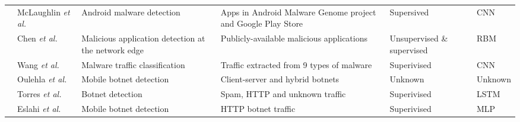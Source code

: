 \documentclass[journal,comsoc,letter]{IEEEtran}
\begin{document}
\begin{table*}[h!]
\begin{tabular}{|c|C{2.1cm}|C{3.3cm}|C{6cm}|C{1.7cm}|C{1.7cm}|}
                                      & McLaughlin \emph{et al.} \cite{mclaughlin2017deep}       & Android malware detection                                       & Apps in Android Malware Genome project and Google Play Store                                                                          & Supersived                 & CNN                                                      \\  
                                      & Chen \emph{et al.} \cite{chen2017deep123}                & Malicious application detection at the network edge             & Publicly-available malicious applications                                                                                             & Unsupervised \& supervised & RBM                                                      \\  
                                      & Wang \emph{et al.} \cite{wang2017malware}                & Malware traffic classification                                  & Traffic extracted from 9 types of malware                                                                                             & Superivised                & CNN                                                      \\  
                                      & Oulehla \emph{et al.} \cite{oulehla2016detection}        & Mobile botnet detection                                         & Client-server and hybrid botnets                                                                                                      & Unknown                    & Unknown                                                  \\  
                                      & Torres \emph{et al.} \cite{torres2016analysis}           & Botnet detection                                                & Spam, HTTP and unknown traffic                                                                                                        & Superivised                & LSTM                                                     \\  
                                      & Eslahi \emph{et al.} \cite{eslahi2016mobile}             & Mobile botnet detection                                         & HTTP botnet traffic                                                                                                                   & Superivised                & MLP                                                      \\  

\end{tabular}
\end{table*}
\end{document}
